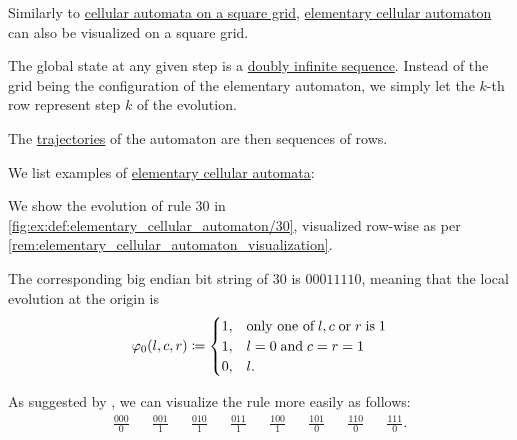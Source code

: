 \begin{remark}\label{rem:elementary_cellular_automaton_visualization}
  Similarly to \hyperref[rem:automata_on_square_grid]{cellular automata on a square grid}, \hyperref[def:elementary_cellular_automaton]{elementary cellular automaton} can also be visualized on a square grid.

  The global state at any given step is a \hyperref[def:doubly_infinite_sequence]{doubly infinite sequence}. Instead of the grid being the configuration of the elementary automaton, we simply let the \( k \)-th row represent step \( k \) of the evolution.

  The \hyperref[def:dynamical_system_trajectory]{trajectories} of the automaton are then sequences of rows.
\end{remark}

\begin{example}\label{ex:def:elementary_cellular_automaton}
  We list examples of \hyperref[def:elementary_cellular_automaton]{elementary cellular automata}:
  \begin{thmenum}
     We show the evolution of rule \( 30 \) in \cref{fig:ex:def:elementary_cellular_automaton/30}, visualized row-wise as per \cref{rem:elementary_cellular_automaton_visualization}.

    The corresponding big endian bit string of \( 30 \) is \( 00011110 \), meaning that the local evolution at the origin is
    \begin{equation*}
      \varphi_0(l, c, r) \coloneqq \begin{cases}
        1, &\T{only one of} l, c \T{or} r \T{is} 1 \\
        1, &l = 0 \T{and} c = r = 1 \\
        0, &l.
      \end{cases}
    \end{equation*}

    As suggested by , we can visualize the rule more easily as follows:
    \begin{align*}
      \frac {000} 0
      &&
      \frac {001} 1
      &&
      \frac {010} 1
      &&
      \frac {011} 1
      &&
      \frac {100} 1
      &&
      \frac {101} 0
      &&
      \frac {110} 0
      &&
      \frac {111} 0.
    \end{align*}


\end{thmenum}
\end{example}

